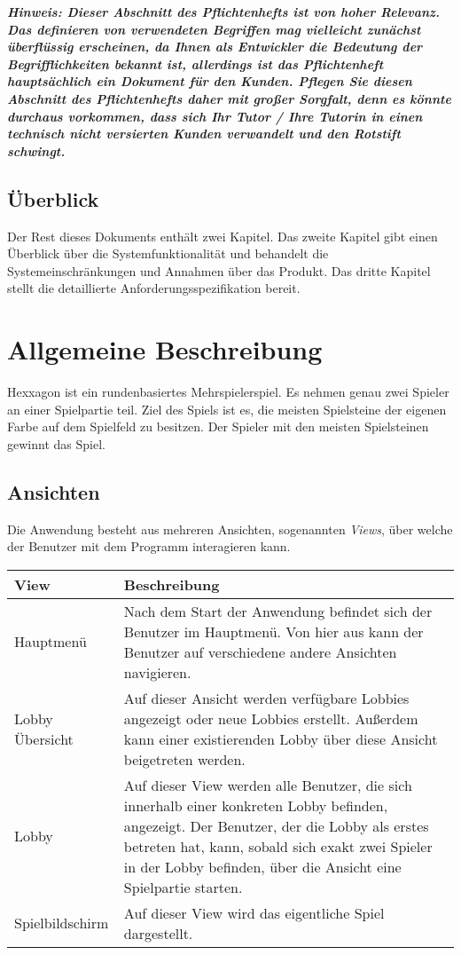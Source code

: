 \documentclass{uulm-assignment}
\begin{document}
\textbf{\textit{Hinweis: Dieser Abschnitt des Pflichtenhefts ist von hoher Relevanz. Das definieren von verwendeten Begriffen mag vielleicht zunächst überflüssig erscheinen, da Ihnen als Entwickler die Bedeutung der Begrifflichkeiten bekannt ist, allerdings ist das Pflichtenheft hauptsächlich ein Dokument für den Kunden. Pflegen Sie diesen Abschnitt des Pflichtenhefts daher mit großer Sorgfalt, denn es könnte durchaus vorkommen, dass sich Ihr Tutor / Ihre Tutorin in einen technisch nicht versierten Kunden verwandelt und den Rotstift schwingt.}}

\subsection{Überblick}

Der Rest dieses Dokuments enthält zwei Kapitel. Das zweite Kapitel gibt einen Überblick über die
Systemfunktionalität und behandelt die Systemeinschränkungen und Annahmen über das Produkt.
Das dritte Kapitel stellt die detaillierte Anforderungsspezifikation bereit.

\section{Allgemeine Beschreibung}

Hexxagon ist ein rundenbasiertes Mehrspielerspiel. Es nehmen genau zwei Spieler an einer Spielpartie teil. Ziel des Spiels ist es, die meisten Spielsteine der eigenen Farbe auf dem Spielfeld zu besitzen. Der Spieler mit den meisten Spielsteinen gewinnt das Spiel.

\subsection{Ansichten}

Die Anwendung besteht aus mehreren Ansichten, sogenannten \textit{Views}, über welche der Benutzer mit dem Programm interagieren kann.

\begin{tabularx}{16cm}{l|X}
\textbf{View} & \textbf{Beschreibung} \\
\hline
Hauptmenü & Nach dem Start der Anwendung befindet sich der Benutzer im Hauptmenü. Von hier aus kann der Benutzer auf verschiedene andere Ansichten navigieren. \\
\hline
Lobby Übersicht & Auf dieser Ansicht werden verfügbare Lobbies angezeigt oder neue Lobbies erstellt. Außerdem kann einer existierenden Lobby über diese Ansicht beigetreten werden. \\
\hline
Lobby & Auf dieser View werden alle Benutzer, die sich innerhalb einer konkreten Lobby befinden, angezeigt. Der Benutzer, der die Lobby als erstes betreten hat, kann, sobald sich exakt zwei Spieler in der Lobby befinden, über die Ansicht eine Spielpartie starten. \\
\hline
Spielbildschirm & Auf dieser View wird das eigentliche Spiel dargestellt. \\
\end{tabularx}
\end{document}
